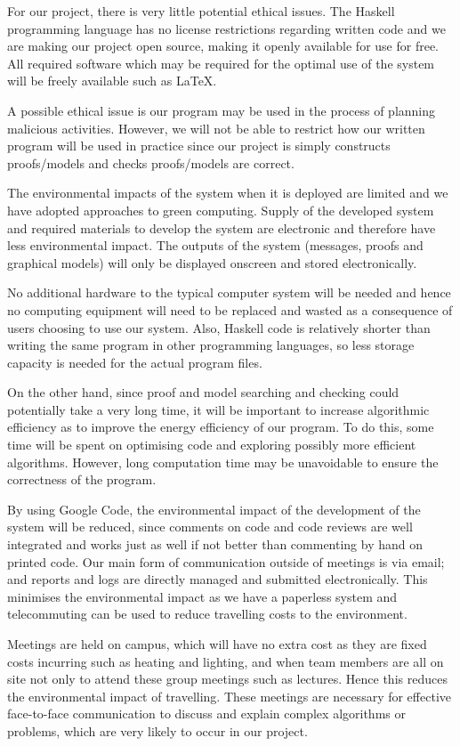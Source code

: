 For our project, there is very little potential ethical issues. The Haskell programming language has no license restrictions regarding written code and we are making our project open source, making it openly available for use for free. All required software which may be required for the optimal use of the system will be freely available such as \LaTeX{}.

A possible ethical issue is our program may be used in the process of planning malicious activities. However, we will not be able to restrict how our written program will be used in practice since our project is simply constructs proofs/models and checks proofs/models are correct.

The environmental impacts of the system when it is deployed are limited and we have adopted approaches to green computing. Supply of the developed system and required materials to develop the system are electronic and therefore have less environmental impact. The outputs of the system (messages, proofs and graphical models) will only be displayed onscreen and stored electronically.

No additional hardware to the typical computer system will be needed and hence no computing equipment will need to be replaced and wasted as a consequence of users choosing to use our system. Also, Haskell code is relatively shorter than writing the same program in other programming languages, so less storage capacity is needed for the actual program files.

On the other hand, since proof and model searching and checking could potentially take a very long time, it will be important to increase algorithmic efficiency as to improve the energy efficiency of our program. To do this, some time will be spent on optimising code and exploring possibly more efficient algorithms. However, long computation time may be unavoidable to ensure the correctness of the program.

By using Google Code, the environmental impact of the development of the system will be reduced, since comments on code and code reviews are well integrated and works just as well if not better than commenting by hand on printed code. Our main form of communication outside of meetings is via email; and reports and logs are directly managed and submitted electronically. This minimises the environmental impact as we have a paperless system and telecommuting can be used to reduce travelling costs to the environment.

Meetings are held on campus, which will have no extra cost as they are fixed costs incurring such as heating and lighting, and when team members are all on site not only to attend these group meetings such as lectures. Hence this reduces the environmental impact of travelling. These meetings are necessary for effective face-to-face communication to discuss and explain complex algorithms or problems, which are very likely to occur in our project.
